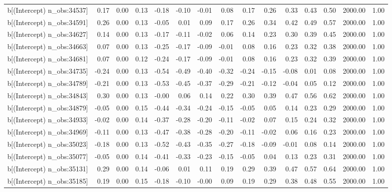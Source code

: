 \begin{table}[ht]
\begin{tabular}{rrrrrrrrrrrrrrr}
  b[(Intercept) n\_obs:34537] & 0.17 & 0.00 & 0.13 & -0.18 & -0.10 & -0.01 & 0.08 & 0.17 & 0.26 & 0.33 & 0.43 & 0.50 & 2000.00 & 1.00 \\ 
  b[(Intercept) n\_obs:34591] & 0.26 & 0.00 & 0.13 & -0.05 & 0.01 & 0.09 & 0.17 & 0.26 & 0.34 & 0.42 & 0.49 & 0.57 & 2000.00 & 1.00 \\ 
  b[(Intercept) n\_obs:34627] & 0.14 & 0.00 & 0.13 & -0.17 & -0.11 & -0.02 & 0.06 & 0.14 & 0.23 & 0.30 & 0.39 & 0.45 & 2000.00 & 1.00 \\ 
  b[(Intercept) n\_obs:34663] & 0.07 & 0.00 & 0.13 & -0.25 & -0.17 & -0.09 & -0.01 & 0.08 & 0.16 & 0.23 & 0.32 & 0.38 & 2000.00 & 1.00 \\ 
  b[(Intercept) n\_obs:34681] & 0.07 & 0.00 & 0.12 & -0.24 & -0.17 & -0.09 & -0.01 & 0.08 & 0.16 & 0.23 & 0.32 & 0.39 & 2000.00 & 1.00 \\ 
  b[(Intercept) n\_obs:34735] & -0.24 & 0.00 & 0.13 & -0.54 & -0.49 & -0.40 & -0.32 & -0.24 & -0.15 & -0.08 & 0.01 & 0.08 & 2000.00 & 1.00 \\ 
  b[(Intercept) n\_obs:34789] & -0.21 & 0.00 & 0.13 & -0.53 & -0.45 & -0.37 & -0.29 & -0.21 & -0.12 & -0.04 & 0.05 & 0.12 & 2000.00 & 1.00 \\ 
  b[(Intercept) n\_obs:34843] & 0.30 & 0.00 & 0.13 & -0.00 & 0.06 & 0.14 & 0.22 & 0.30 & 0.39 & 0.47 & 0.56 & 0.62 & 2000.00 & 1.00 \\ 
  b[(Intercept) n\_obs:34879] & -0.05 & 0.00 & 0.15 & -0.44 & -0.34 & -0.24 & -0.15 & -0.05 & 0.05 & 0.14 & 0.23 & 0.29 & 2000.00 & 1.00 \\ 
  b[(Intercept) n\_obs:34933] & -0.02 & 0.00 & 0.14 & -0.37 & -0.28 & -0.20 & -0.11 & -0.02 & 0.07 & 0.15 & 0.24 & 0.32 & 2000.00 & 1.00 \\ 
  b[(Intercept) n\_obs:34969] & -0.11 & 0.00 & 0.13 & -0.47 & -0.38 & -0.28 & -0.20 & -0.11 & -0.02 & 0.06 & 0.16 & 0.23 & 2000.00 & 1.00 \\ 
  b[(Intercept) n\_obs:35023] & -0.18 & 0.00 & 0.13 & -0.52 & -0.43 & -0.35 & -0.27 & -0.18 & -0.09 & -0.01 & 0.08 & 0.14 & 2000.00 & 1.00 \\ 
  b[(Intercept) n\_obs:35077] & -0.05 & 0.00 & 0.14 & -0.41 & -0.33 & -0.23 & -0.15 & -0.05 & 0.04 & 0.13 & 0.23 & 0.31 & 2000.00 & 1.00 \\ 
  b[(Intercept) n\_obs:35131] & 0.29 & 0.00 & 0.14 & -0.06 & 0.01 & 0.11 & 0.19 & 0.29 & 0.39 & 0.47 & 0.57 & 0.64 & 2000.00 & 1.00 \\ 
  b[(Intercept) n\_obs:35185] & 0.19 & 0.00 & 0.15 & -0.18 & -0.10 & -0.00 & 0.09 & 0.19 & 0.29 & 0.38 & 0.48 & 0.55 & 2000.00 & 1.00 \\ 

\end{tabular}
\end{table}
